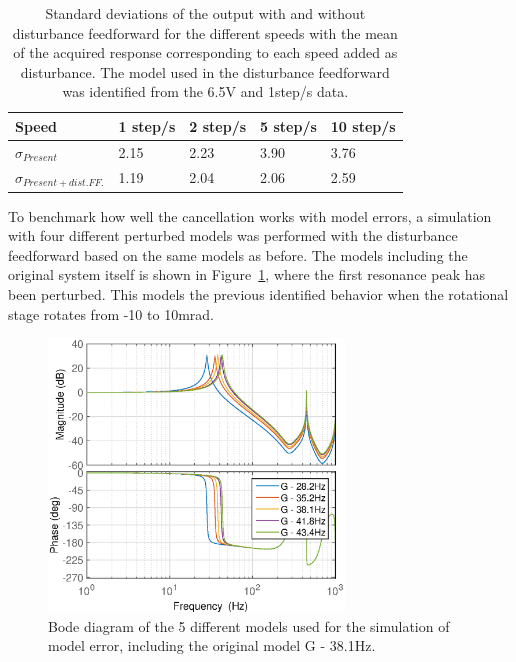 \begin{table}[h!]
  \centering
  \begin{tabular}{| l | l | l | l | l |}
    \hline
      Speed & 1 step/s & 2 step/s & 5 step/s & 10 step/s\\ \hline
      $\sigma_{Present}$ & 2.15 & 2.23 & 3.90 & 3.76\\
      $\sigma_{Present + dist.FF.}$ & 1.19 & 2.04 & 2.06 & 2.59\\
    \hline
  \end{tabular}
  \caption{\label{tab:std_diff_speed} Standard deviations of the output with and without disturbance feedforward for the different speeds with the mean of the acquired response corresponding to each speed added as disturbance. The model used in the disturbance feedforward was identified from the 6.5V and 1step/s data.}
\end{table}

\FloatBarrier
To benchmark how well the cancellation works with model errors, a simulation with four different perturbed models was performed with the disturbance feedforward based on the same models as before. The models including the original system itself is shown in Figure~\ref{fig:hc_me_bode}, where the first resonance peak has been perturbed. This models the previous identified behavior when the rotational stage rotates from -10 to 10mrad.

\begin{figure}[h!]
  \centering
  \includegraphics[width=0.7\textwidth]{fig/matlab/bode_rfdc_modelerror.eps}
  \caption{\label{fig:hc_me_bode} Bode diagram of the 5 different models used for the simulation of model error, including the original model G - 38.1Hz.}
\end{figure}

